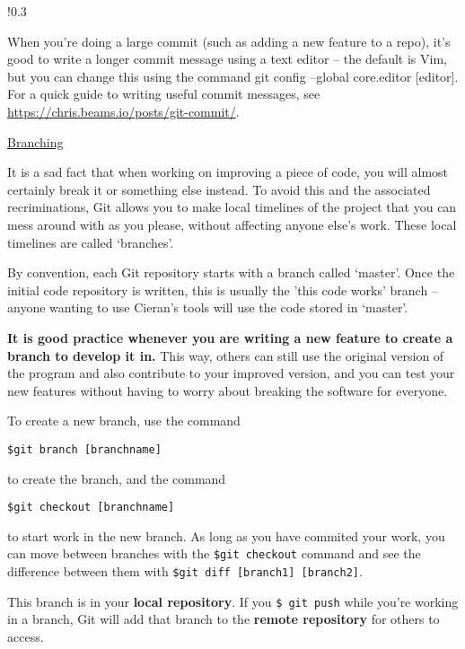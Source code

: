 \documentclass[11pt, a4paper, english]{article}
\newenvironment{wrapbox}
	{
		\begin{wrapfigure}{!}{0.3\textwidth}
		\begin{tcolorbox}
	}
	{
		\end{tcolorbox}
		\end{wrapfigure}
	}
\begin{document}
\begin{wrapbox} 
When you're doing a large commit (such as adding a new feature to a repo), it’s good to write a longer commit message using a text editor – the default is Vim, but you can change this using the command git config –global core.editor [editor]. For a quick guide to writing useful commit messages, see \url{https://chris.beams.io/posts/git-commit/}.
\end{wrapbox}

\underline{Branching}

It is a sad fact that when working on improving a piece of code, you will almost certainly break it or something else instead. To avoid this and the associated recriminations, Git allows you to make local timelines of the project that you can mess around with as you please, without affecting anyone else’s work. These local timelines are called ‘branches’.

By convention, each Git repository starts with a branch called ‘master’. Once the initial code repository is written, this is usually the 'this code works' branch – anyone wanting to use Cieran’s tools will use the code stored in ‘master’. 

\textbf{It is good practice whenever you are writing a new feature to create a branch to develop it in.} This way, others can still use the original version of the program and also contribute to your improved version, and you can test your new features without having to worry about breaking the software for everyone.

To create a new branch, use the command

\begin{verbatim}
$git branch [branchname]
\end{verbatim}

to  create the branch, and the command

\begin{verbatim}
$git checkout [branchname]
\end{verbatim}

to start work in the new branch. As long as you have commited your work, you can move between branches with the \verb|$git checkout| command and see the difference between them with \verb|$git diff [branch1] [branch2]|.

This branch is in your \textbf{local repository}. If you \verb|$ git push| while you’re working in a branch, Git will add that branch to the \textbf{remote repository} for others to access.
\end{document}
